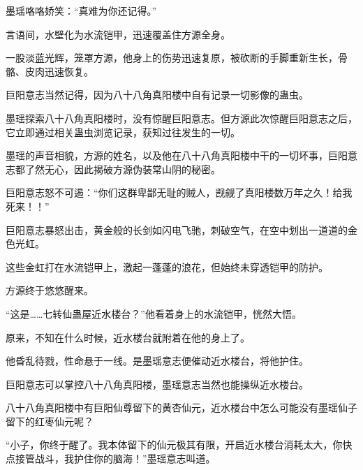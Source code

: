 \begin{this_body}
墨瑶咯咯娇笑：“真难为你还记得。”

言语间，水壁化为水流铠甲，迅速覆盖住方源全身。

一股淡蓝光辉，笼罩方源，他身上的伤势迅速复原，被砍断的手脚重新生长，骨骼、皮肉迅速恢复。

巨阳意志当然记得，因为八十八角真阳楼中自有记录一切影像的蛊虫。

墨瑶探索八十八角真阳楼时，没有惊醒巨阳意志。但方源此次惊醒巨阳意志之后，它立即通过相关蛊虫浏览记录，获知过往发生的一切。

墨瑶的声音相貌，方源的姓名，以及他在八十八角真阳楼中干的一切坏事，巨阳意志都了然无心，因此揭破方源伪装常山阴的秘密。

巨阳意志怒不可遏：“你们这群卑鄙无耻的贼人，觊觎了真阳楼数万年之久！给我死来！！”

巨阳意志暴怒出击，黄金般的长剑如闪电飞驰，刺破空气，在空中划出一道道的金色光虹。

这些金虹打在水流铠甲上，激起一蓬蓬的浪花，但始终未穿透铠甲的防护。

方源终于悠悠醒来。

“这是……七转仙蛊屋近水楼台？”他看着身上的水流铠甲，恍然大悟。

原来，不知在什么时候，近水楼台就附着在他的身上了。

他昏乱待戮，性命悬于一线。是墨瑶意志便催动近水楼台，将他护住。

巨阳意志可以掌控八十八角真阳楼，墨瑶意志当然也能操纵近水楼台。

八十八角真阳楼中有巨阳仙尊留下的黄杏仙元，近水楼台中怎么可能没有墨瑶仙子留下的红枣仙元呢？

“小子，你终于醒了。我本体留下的仙元极其有限，开启近水楼台消耗太大，你快点接管战斗，我护住你的脑海！”墨瑶意志叫道。

\end{this_body}

